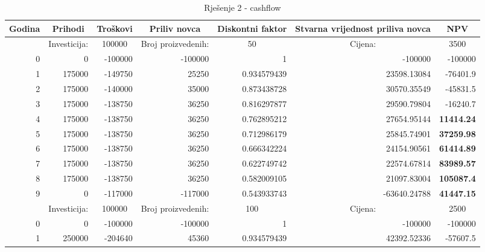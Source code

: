 \documentclass[12pt]{article}
\begin{document}
\begin{landscape}
\begin{table}[htbp]
  \centering
  \caption{Rješenje 2 - cashflow}
    \begin{tabular}{rrrrrrr}
    \toprule
    \multicolumn{1}{c}{Godina} & \multicolumn{1}{c}{Prihodi} & \multicolumn{1}{c}{Troškovi} & \multicolumn{1}{c}{Priliv novca} & \multicolumn{1}{c}{Diskontni faktor} & \multicolumn{1}{p{8.145em}}{Stvarna vrijednost \newline{}priliva novca} & \multicolumn{1}{c}{NPV} \\
    \midrule
          & \multicolumn{1}{c}{Investicija:} & \multicolumn{1}{c}{100000} & \multicolumn{1}{c}{Broj proizvedenih:} & \multicolumn{1}{c}{50} & \multicolumn{1}{c}{Cijena:} & \multicolumn{1}{c}{3500} \\
    \midrule
0     & 0     & -100000 & -100000 & 1     & -100000 & -100000 \\
    1     & 175000 & -149750 & 25250 & 0.934579439 & 23598.13084 & -76401.9 \\
    2     & 175000 & -140000 & 35000 & 0.873438728 & 30570.35549 & -45831.5 \\
    3     & 175000 & -138750 & 36250 & 0.816297877 & 29590.79804 & -16240.7 \\
    4     & 175000 & -138750 & 36250 & 0.762895212 & 27654.95144 & \textbf{11414.24} \\
    5     & 175000 & -138750 & 36250 & 0.712986179 & 25845.74901 & \textbf{37259.98} \\
    6     & 175000 & -138750 & 36250 & 0.666342224 & 24154.90561 & \textbf{61414.89} \\
    7     & 175000 & -138750 & 36250 & 0.622749742 & 22574.67814 & \textbf{83989.57} \\
    8     & 175000 & -138750 & 36250 & 0.582009105 & 21097.83004 & \textbf{105087.4} \\
    \midrule
    9     & 0     & -117000 & -117000 & 0.543933743 & -63640.24788 & \textbf{41447.15} \\
    \midrule
          & \multicolumn{1}{c}{Investicija:} & \multicolumn{1}{c}{100000} & \multicolumn{1}{c}{Broj proizvedenih:} & \multicolumn{1}{c}{100} & \multicolumn{1}{c}{Cijena:} & \multicolumn{1}{c}{2500} \\
    \midrule
    0     & 0     & -100000 & -100000 & 1     & -100000 & -100000 \\
    1     & 250000 & -204640 & 45360 & 0.934579439 & 42392.52336 & -57607.5 \\

\end{tabular}
\end{table}
\end{landscape}
\end{document}
